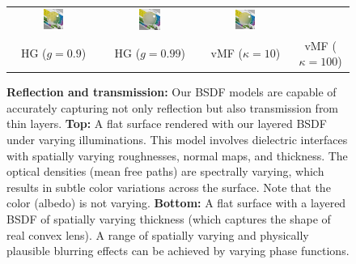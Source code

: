 \begin{figure}[t]
\begin{tabular}{cccc}
		\includegraphics[width=0.24\textwidth]{images/results/magnify_g99.jpg} &
		\includegraphics[width=0.24\textwidth]{images/results/magnify_vmf10.jpg} &
		\includegraphics[width=0.24\textwidth]{images/results/magnify_vmf100.jpg}\\
		HG ($g = 0.9$) & HG ($g = 0.99$) & vMF ($\kappa = 10$) & vMF ($\kappa = 100$)
	\end{tabular}
	\caption{\label{fig:result_transmit}
		\textbf{Reflection and transmission:}
		Our BSDF models are capable of accurately capturing not only reflection but also transmission from thin layers. \textbf{Top:} A flat surface rendered with our layered BSDF under varying illuminations. This model involves dielectric interfaces with spatially varying roughnesses, normal maps, and thickness. The optical densities (mean free paths) are spectrally varying, which results in subtle color variations across the surface. Note that the color (albedo) is not varying. \textbf{Bottom:} A flat surface with a layered BSDF of spatially varying thickness (which captures the shape of real convex lens). A range of spatially varying and physically plausible blurring effects can be achieved by varying phase functions.
	}
\end{figure}



